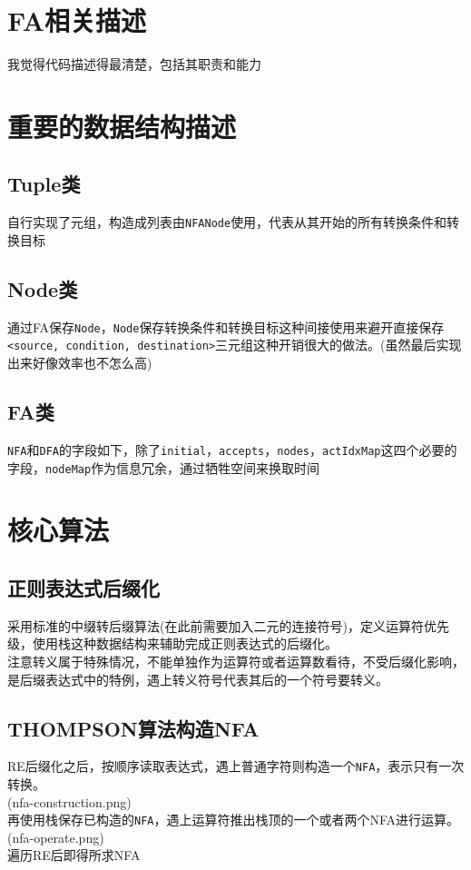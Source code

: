 \documentclass[a4paper]{ctexart} %
\begin{document}
	\section{FA相关描述}
	我觉得代码描述得最清楚，包括其职责和能力

	\section{重要的数据结构描述}

	\subsection{Tuple类}
	自行实现了元组，构造成列表由\verb|NFANode|使用，代表从其开始的所有转换条件和转换目标

	\subsection{Node类}
	通过FA保存\verb|Node|，\verb|Node|保存转换条件和转换目标这种间接使用来避开直接保存\verb|<source, condition, destination>|三元组这种开销很大的做法。(虽然最后实现出来好像效率也不怎么高)

	\subsection{FA类}
	\verb|NFA|和\verb|DFA|的字段如下，除了\verb|initial|，\verb|accepts|，\verb|nodes|，\verb|actIdxMap|这四个必要的字段，\verb|nodeMap|作为信息冗余，通过牺牲空间来换取时间

	\section{核心算法}
	\subsection{正则表达式后缀化}
	采用标准的中缀转后缀算法(在此前需要加入二元的连接符号)，定义运算符优先级，使用栈这种数据结构来辅助完成正则表达式的后缀化。\\
	注意转义属于特殊情况，不能单独作为运算符或者运算数看待，不受后缀化影响，是后缀表达式中的特例，遇上转义符号代表其后的一个符号要转义。

	\subsection{THOMPSON算法构造NFA}
	RE后缀化之后，按顺序读取表达式，遇上普通字符则构造一个\verb|NFA|，表示只有一次转换。\\
	(nfa-construction.png)\\
	再使用栈保存已构造的\verb|NFA|，遇上运算符推出栈顶的一个或者两个NFA进行运算。\\
	(nfa-operate.png)\\
	遍历RE后即得所求NFA
\end{document}
